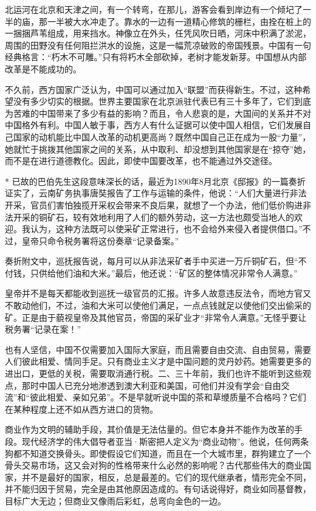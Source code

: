 \documentclass[12pt,oneside]{book}
\begin{document}
\begin{common-format}
北运河在北京和天津之间，有一个转弯，在那儿，游客会看到岸边有一个倾圮了一半的庙，那一半被大水冲走了。靠水的一边有一道精心修筑的栅栏，由拴在桩上的一捆捆芦苇组成，用来挡水。神像立在外头，任凭风吹日晒，河床中积满了淤泥，周围的田野没有任何阻拦洪水的设施，这是一幅荒凉破败的帝国残景。中国有一句经典格言：“朽木不可雕。”只有将朽木全部砍掉，老树才能发新芽。中国想从内部改革是不能成功的。 

不久前，西方国家广泛认为，中国可以通过加入“联盟”而获得新生。不过，这种希望没有多少切实的根据。世界主要国家在北京派驻代表已有三十多年了，它们到底为苦难的中国带来了多少有益的影响？而且，令人悲哀的是，大国间的关系并不对中国格外有利。中国人敏于事，西方人有什么证据可以使中国人相信，它们发展自己国家的动机能比中国人改革的动机更高尚？既然中国自己正在成为一股“力量”，她就忙于挑拨其他国家之间的关系，从中取利、却没想到其他国家是在“掠夺”她，而不是在进行道德教化。因此，即使中国要改革，也不能通过外交途径。

* 已故的巴伯先生这段意味深长的话，最近为1890年8月北京《邸报》的一篇奏折证实了，云南矿务执事唐奘报告了工作与运输的条件，他说：“人们大量进行非法开采，官员们害怕独揽开采权会带来不良后果，就想了一个办法，他们低价购进非法开采的铜矿石，较有效地利用了人们的额外劳动，这一方法也颇受当地人的欢迎。我认为，这种方法既可以使采矿正常进行，也不会给外来侵入者提供借口。”不过，皇帝只命令税务署将这份奏章“记录备案。” 

奏折附文中，巡抚报告说，每月可以从非法采矿者手中买进一万斤铜矿石，但“不付钱，只供给他们油和大米。”最后，他还说：“矿区的整体情况非常令人满意。” 

皇帝并不是每天都能收到巡抚一级官员的汇报。许多人故意违反法令，而地方官又不敢动他们，不过，油和大米可以使他们满足，一点点钱就足以使他们交出偷采的矿。正是由于藐视皇帝及其他官员，帝国的采矿业才“非常令人满意。”无怪乎要让税务署“记录在案！” 

也有人坚信，中国不仅需要加入国际大家庭，而且需要自由交流、自由贸易，需要人们彼此相爱、情同手足。只有商业主义才是中国问题的灵丹妙药。她需要更多的进出口，更低的关税，需要取消通行税。二、三十年前，我们也许不能听到这些观点，那时中国人已充分地渗透到澳大利亚和美国，可他们并没有学会“自由交流”和“彼此相爱、亲如兄弟”。不是早就听说中国的茶和草缏质量不合格吗？它们在某种程度上还不如从西方进口的货物。 

商业作为文明的辅助手段，其价值是无法估量的。但它本身并不能作为改革的手段。现代经济学的伟大倡导者亚当·斯密把人定义为“商业动物”。他说，任何两条狗都不知道交换骨头。即使假设它们知道，而且在一个大城市里，群狗建立了一个骨头交易市场，这又会对狗的性格带来什么必然的影响呢？古代那些伟大的商业国家，并不是最好的国家，相反，总是最差的。它们的现代继承者，情形完全不同，并不能归因于贸易，完全是由其他原因造成的。有句话说得好，商业如同基督教，目标广大无边；但商业又像雨后彩虹，总弯向金色的一边。 


\end{common-format}
\end{document}
